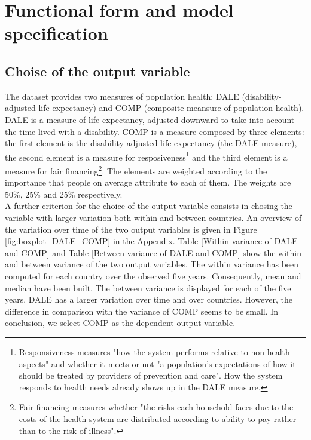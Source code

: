 \documentclass[12pt,a4paper]{article}\usepackage[]{graphicx}\usepackage[]{color}
\begin{document}
\section{Functional form and model specification}
\subsection{Choise of the output variable}
The dataset provides two measures of population health: DALE (disability-adjusted life expectancy) and COMP (composite meansure of population health). DALE is a measure of life expectancy, adjusted downward to take into account the time lived with a disability. COMP is a measure composed by three elements: the first element is the disability-adjusted life expectancy (the DALE measure), the second element is a measure for resposiveness\footnote{Responsiveness measures "how the system performs relative to non-health aspects" and whether it meets or not "a population's expectations of how it should be treated by providers of prevention and care". How the system responds to health needs already shows up in the DALE measure.} and the third element is a measure for fair financing\footnote{Fair financing measures whether "the risks each household faces due to the costs of the health system are distributed according to ability to pay rather than to the risk of illness".}. The elements are weighted according to the importance that people on average attribute to each of them. The weights are 50\%, 25\% and 25\% respectively. \\




A further criterion for the choice of the output variable consists in chosing the variable with larger variation both within and between countries. An overview of the variation over time of the two output variables is given in Figure \ref{fig:boxplot_DALE_COMP} in the Appendix. Table \ref{Within variance of DALE and COMP} and Table \ref{Between variance of DALE and COMP} show the within and between variance of the two output variables. The within variance has been computed for each country over the observed five years. Consequently, mean and median have been built. The between variance is displayed for each of the five years. DALE has a larger variation over time and over countries. However, the difference in comparison with the variance of COMP seems to be small. In conclusion, we select COMP as the dependent output variable.
\end{document}
